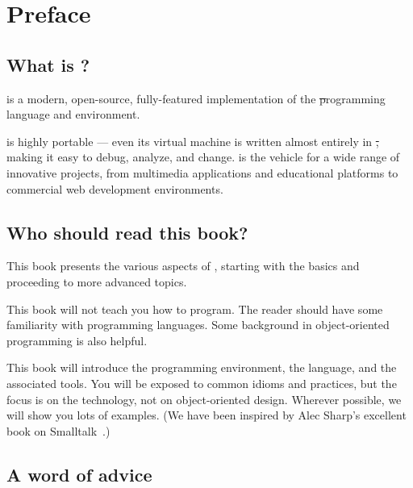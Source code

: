 \documentclass[a4paper,10pt,twoside]{book}
\begin{document}
	\renewcommand{\nnbb}[2]{} %
	\frontmatter
\fi
\chapter{Preface}\label{cha:intro}

\section*{What is \sq?}

\sq is a modern, open-source, fully-featured implementation of the \st programming language and environment.

\sq is highly portable --- even its virtual machine is written almost entirely in \st, making it easy to debug, analyze, and change.
\sq is the vehicle for a wide range of innovative projects, from multimedia applications and educational platforms to commercial web development environments.

\section*{Who should read this book?}

This book presents the various aspects of \sq, starting with the basics and proceeding to more advanced topics.

This book will not teach you how to program.
The reader should have some familiarity with programming languages.
Some background in object-oriented programming is also helpful.

This book will introduce the \sq programming environment, the language, and the associated tools.
You will be exposed to common idioms and practices, but the focus is on the technology, not on object-oriented design.
Wherever possible, we will show you lots of examples.
(We have been inspired by Alec Sharp's excellent book on Smalltalk~\cite{Shar97a}.)

\ifluluelse{}{\newpage} %
\section*{A word of advice}

\end{document}
